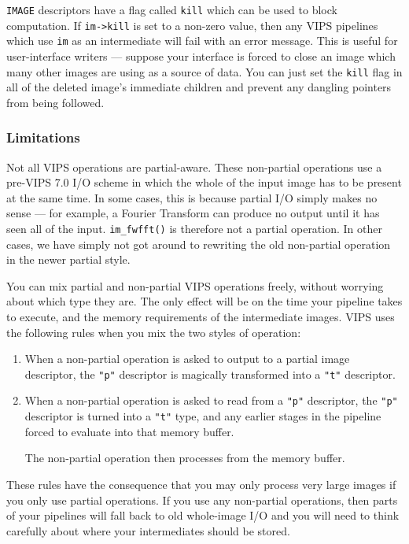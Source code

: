 \verb+IMAGE+ descriptors have a flag called \verb+kill+ which can be used
to block computation.  If \verb+im->kill+ is set to a non-zero value,
then any VIPS pipelines which use \verb+im+ as an intermediate will fail
with an error message.  This is useful for user-interface writers ---
suppose your interface is forced to close an image which many other images
are using as a source of data. You can just set the \verb+kill+ flag in all
of the deleted image's immediate children and prevent any dangling pointers
from being followed.

\subsubsection{Limitations}
\label{sec:limit}

Not all VIPS operations are partial-aware. These non-partial operations
use a pre-VIPS 7.0 I/O scheme in which the whole of the input image has to
be present at the same time.  In some cases, this is because partial I/O
simply makes no sense --- for example, a Fourier Transform can produce no
output until it has seen all of the input.  \verb+im_fwfft()+ is therefore
not a partial operation. In other cases, we have simply not got around to
rewriting the old non-partial operation in the newer partial style.

You can mix partial and non-partial VIPS operations freely, without worrying
about which type they are. The only effect will be on the time your pipeline
takes to execute, and the memory requirements of the intermediate images. VIPS
uses the following rules when you mix the two styles of operation:

\begin{enumerate}

\item
When a non-partial operation is asked to output to a partial image descriptor,
the \verb+"p"+ descriptor is magically transformed into a \verb+"t"+
descriptor.

\item
When a non-partial operation is asked to read from a \verb+"p"+ descriptor,
the \verb+"p"+ descriptor is turned into a \verb+"t"+ type, and any earlier
stages in the pipeline forced to evaluate into that memory buffer. 

The non-partial operation then processes from the memory buffer.

\end{enumerate}

These rules have the consequence that you may only process very large images
if you only use partial operations. If you use any non-partial operations,
then parts of your pipelines will fall back to old whole-image I/O and you
will need to think carefully about where your intermediates should be stored.

